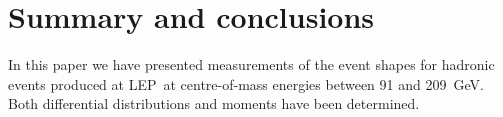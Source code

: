 \documentclass[12pt,a4paper,twoside]{article}
\newcommand{\as}     {\ensuremath{\alpha_{\mathrm{s}}}}
\newcommand{\asmz}   {\ensuremath{\alpha_{\mathrm{s}}(\mz)}}
\newcommand{\mz}     {\ensuremath{M_{\mathrm{Z}}}}
\newcommand{\bm}[1]  {\mbox{\boldmath\ensuremath{#1}}}
\newcommand{\Lep}{\mbox{LEP}}
\begin{document}



\section{ Summary and conclusions }
\label{sec_conc}
In this paper we have presented measurements of the event shapes for
hadronic events produced at \Lep\ at centre-of-mass energies between 91
and 209~GeV.  Both differential distributions and moments have been 
determined.
\end{document}
